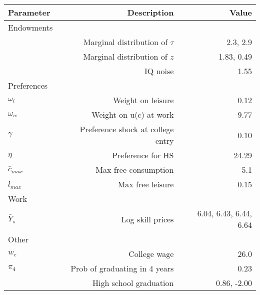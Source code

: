 \begin{tabular}{lrr}
\hline
Parameter & Description  & Value  \\ 
\hline
Endowments &   &   \\ 
 & Marginal distribution of $\tau$  & 2.3, 2.9  \\ 
 & Marginal distribution of $z$  & 1.83, 0.49  \\ 
 & IQ noise  & 1.55  \\ 
Preferences &   &   \\ 
$\omega_{l}$ & Weight on leisure  & 0.12  \\ 
$\omega_{w}$ & Weight on u(c) at work  & 9.77  \\ 
$\gamma$ & Preference shock at college entry  & 0.10  \\ 
$\bar{\eta}$ & Preference for HS  & 24.29  \\ 
$\bar{c}_{max}$ & Max free consumption  & 5.1  \\ 
$\bar{l}_{max}$ & Max free leisure  & 0.15  \\ 
Work &   &   \\ 
$\bar{Y}_{s}$ & Log skill prices  & 6.04, 6.43, 6.44, 6.64  \\ 
Other &   &   \\ 
$w_{c}$ & College wage  & 26.0  \\ 
$\pi_{4}$ & Prob of graduating in 4 years  & 0.23  \\ 
 & High school graduation  & 0.86, -2.00  \\ 
\hline
\end{tabular}%
